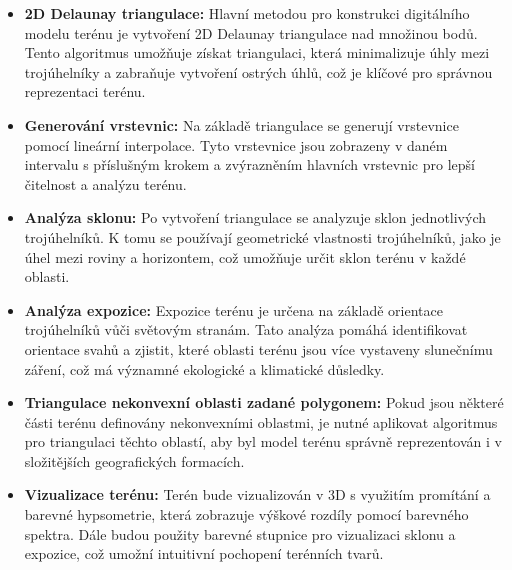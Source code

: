 \begin{itemize}
    \item \textbf{2D Delaunay triangulace:} Hlavní metodou pro konstrukci digitálního modelu terénu je vytvoření 2D Delaunay triangulace nad množinou bodů. Tento algoritmus umožňuje získat triangulaci, která minimalizuje úhly mezi trojúhelníky a zabraňuje vytvoření ostrých úhlů, což je klíčové pro správnou reprezentaci terénu\cite{Bayer2008}.
    
    \item \textbf{Generování vrstevnic:} Na základě triangulace se generují vrstevnice pomocí lineární interpolace. Tyto vrstevnice jsou zobrazeny v daném intervalu s příslušným krokem a zvýrazněním hlavních vrstevnic pro lepší čitelnost a analýzu terénu.

    \item \textbf{Analýza sklonu:} Po vytvoření triangulace se analyzuje sklon jednotlivých trojúhelníků. K tomu se používají geometrické vlastnosti trojúhelníků, jako je úhel mezi roviny a horizontem, což umožňuje určit sklon terénu v každé oblasti.

    \item \textbf{Analýza expozice:} Expozice terénu je určena na základě orientace trojúhelníků vůči světovým stranám. Tato analýza pomáhá identifikovat orientace svahů a zjistit, které oblasti terénu jsou více vystaveny slunečnímu záření, což má významné ekologické a klimatické důsledky.

    \item \textbf{Triangulace nekonvexní oblasti zadané polygonem:} Pokud jsou některé části terénu definovány nekonvexními oblastmi, je nutné aplikovat algoritmus pro triangulaci těchto oblastí, aby byl model terénu správně reprezentován i v složitějších geografických formacích.

    \item \textbf{Vizualizace terénu:} Terén bude vizualizován v 3D s využitím promítání a barevné hypsometrie, která zobrazuje výškové rozdíly pomocí barevného spektra. Dále budou použity barevné stupnice pro vizualizaci sklonu a expozice, což umožní intuitivní pochopení terénních tvarů.
\end{itemize}
